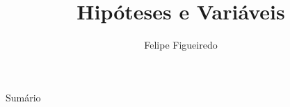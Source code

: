 \documentclass{beamer}
\title%
{Hipóteses e Variáveis}
\subtitle
{} %
\author%
{Felipe Figueiredo}%
\institute[INTO] %
{Instituto Nacional de Traumatologia e Ortopedia
}
\date%
{}
\begin{document}
\begin{frame}
  \titlepage
\end{frame}

\begin{frame}{Sumário}
  \tableofcontents
\end{frame}








\end{document}
